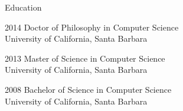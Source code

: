 \begin{vitae}
{\small

\begin{vitaesection}{Education}
  \item [2014] Doctor of Philosophy in Computer Science\\ University of
    California, Santa Barbara
  \item [2013] Master of Science in Computer Science\\ University of
    California, Santa Barbara
  \item [2008] Bachelor of Science in Computer Science\\ University of
    California, Santa Barbara
\end{vitaesection}

}
\end{vitae}
